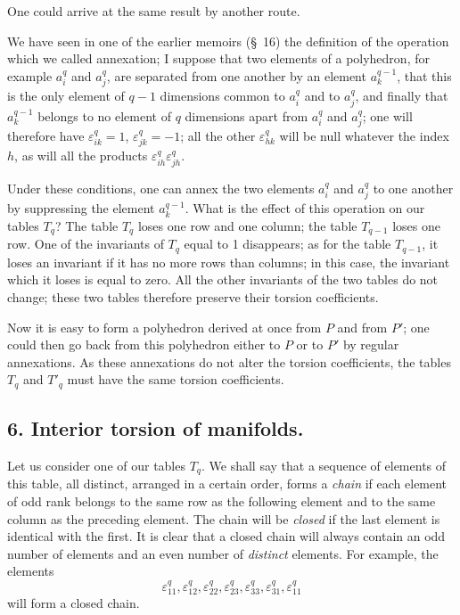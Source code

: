 \documentclass{article}
\begin{document}
One could arrive at the same result by another route.

We have seen in one of the earlier memoirs (\S~16) the definition of the operation which we called annexation; I suppose that two elements of a polyhedron, for example $a^{q}_{i}$ and $a^{q}_{j}$, are separated from one another by an element $a^{q-1}_{k}$, that this is the only element of $q-1$ dimensions common to $a^{q}_{i}$ and to $a^{q}_{j}$, and finally that $a^{q-1}_{k}$ belongs to no element of $q$ dimensions apart from $a^{q}_{i}$ and $a^{q}_{j}$; one will therefore have $\varepsilon^{q}_{ik} = 1$, $\varepsilon^{q}_{jk} = -1$; all the other $\varepsilon^{q}_{hk}$ will be null whatever the index $h$, as will all the products $\varepsilon^{q}_{ih} \varepsilon^{q}_{jh}$.

Under these conditions, one can annex the two elements $a^{q}_{i}$ and $a^{q}_{j}$ to one another by suppressing the element $a^{q-1}_{k}$. What is the effect of this operation on our tables $T_{q}$? The table $T_{q}$ loses one row and one column; the table $T_{q-1}$ loses one row. One of the invariants of $T_{q}$ equal to 1 disappears; as for the table $T_{q-1}$, it loses an invariant if it has
no more rows than columns; in this case, the invariant which it loses is equal to zero. All the other invariants of the two tables do not change; these two tables therefore preserve their torsion coefficients.

Now it is easy to form a polyhedron derived at once from $P$ and from $P'$; one could then go back from this polyhedron either to $P$ or to $P'$ by regular annexations. As these annexations do not alter the torsion coefficients, the tables $T_{q}$ and $T'_{q}$ must have the same torsion coefficients.

\subsection*{6. Interior torsion of manifolds.}

Let us consider one of our tables $T_{q}$. We shall say that a sequence of elements of this table, all distinct, arranged in a certain order, forms a \emph{chain} if each element of odd rank belongs to the same row as the following element and to the same column as the preceding element. The chain will be \emph{closed} if the last element is identical with the first. It is clear that a closed chain will always contain an odd number of elements and an even number of \emph{distinct} elements. For example, the elements
\[ \varepsilon^{q}_{11}, \varepsilon^{q}_{12}, \varepsilon^{q}_{22}, \varepsilon^{q}_{23}, \varepsilon^{q}_{33}, \varepsilon^{q}_{31}, \varepsilon^{q}_{11} \tag{1} \]
will form a closed chain.
\end{document}
